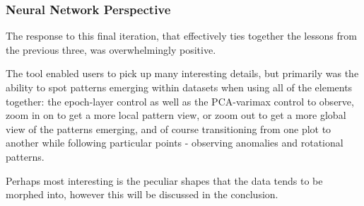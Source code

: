 \documentclass[a4paper,11pt,titlepage]{article}
\begin{document}
	\begin{figure}[H]
    			\centering	
    			 \qquad
    			\caption{}%
    			\label{fig:pca_varimax}
	\end{figure}

	\subsubsection{Neural Network Perspective}
	The response to this final iteration, that effectively ties together the lessons from the previous three, was overwhelmingly positive.
	\par 
	The tool enabled users to pick up many interesting details, but primarily was the ability to spot patterns emerging within datasets when using all of the elements together: the epoch-layer control as well as the PCA-varimax control to observe, zoom in on to get a more local pattern view, or zoom out to get a more global view of the patterns emerging, and of course transitioning from one plot to another while following particular points - observing anomalies and rotational patterns.
	\par 
	Perhaps most interesting is the peculiar shapes that the data tends to be morphed into, however this will be discussed in the conclusion.
	
\end{document}
